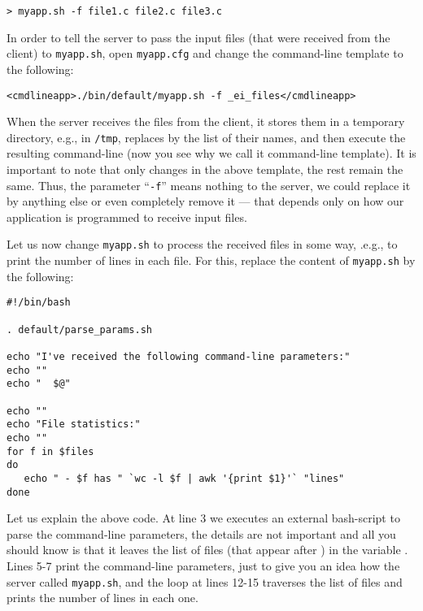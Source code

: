 \medskip
\begin{lstlisting}
> myapp.sh -f file1.c file2.c file3.c
\end{lstlisting}

\medskip 
\noindent
In order to tell the server to pass the input files (that were
received from the client) to \texttt{myapp.sh}, open
\texttt{myapp.cfg} and change the command-line template to the
following:

\medskip
\begin{lstlisting}
<cmdlineapp>./bin/default/myapp.sh -f _ei_files</cmdlineapp>
\end{lstlisting}

\medskip
\noindent
When the server receives the files from the client, it stores them in
a temporary directory, e.g., in \texttt{/tmp}, replaces 
by the list of their names, and then execute the resulting
command-line (now you see why we call it command-line template).
%
It is important to note that only  changes in the above
template, the rest remain the same. Thus, the parameter
``\texttt{-f}'' means nothing to the server, we could replace it by
anything else or even completely remove it --- that depends only on
how our application is programmed to receive input files.

Let us now change \texttt{myapp.sh} to process the received files in
some way, .e.g., to print the number of lines in each file. For this,
replace the content of \texttt{myapp.sh} by the following:

\medskip
\begin{lstlisting}[style=script]
#!/bin/bash

. default/parse_params.sh

echo "I've received the following command-line parameters:"
echo ""
echo "  $@"

echo ""
echo "File statistics:"
echo ""
for f in $files 
do
   echo " - $f has " `wc -l $f | awk '{print $1}'` "lines"
done
\end{lstlisting}

\medskip
\noindent
Let us explain the above code. 
%
At line 3 we executes an external bash-script to parse the
command-line parameters, the details are not important and all you
should know is that it leaves the list of files (that appear after
) in the variable .
%
Lines 5-7 print the command-line parameters, just to give you an idea
how the server called \texttt{myapp.sh}, and the loop at lines 12-15
traverses the list of files and prints the number of lines in each
one.

